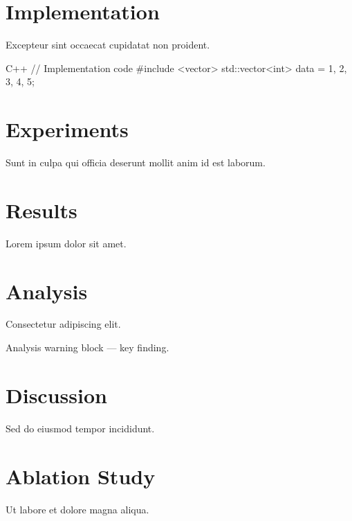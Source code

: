 \documentclass[code=listings]{SUSTechHomework}
\begin{document}
\section{Implementation}
Excepteur sint occaecat cupidatat non proident.

\begin{sustechcode}{C++}
// Implementation code
#include <vector>
std::vector<int> data = {1, 2, 3, 4, 5};
\end{sustechcode}

\section{Experiments}
Sunt in culpa qui officia deserunt mollit anim id est laborum.

\begin{sustechfiguregroup}
  \begin{sustechsubfigure}[0.48\linewidth][Experiment A]
    \sustechplaceholdergraphic[0.92\linewidth][3cm]
  \end{sustechsubfigure}
  \sustechfloatsep
  \begin{sustechsubfigure}[0.48\linewidth][Experiment B]
    \sustechplaceholdergraphic[0.92\linewidth][3cm]
  \end{sustechsubfigure}
  \caption{Experimental results comparison}
\end{sustechfiguregroup}

\section{Results}
Lorem ipsum dolor sit amet.

\section{Analysis}
Consectetur adipiscing elit.

\begin{sustechwarning}[title=Important Result]
Analysis warning block — key finding.
\end{sustechwarning}

\section{Discussion}
Sed do eiusmod tempor incididunt.

\section{Ablation Study}
Ut labore et dolore magna aliqua.
\end{document}
